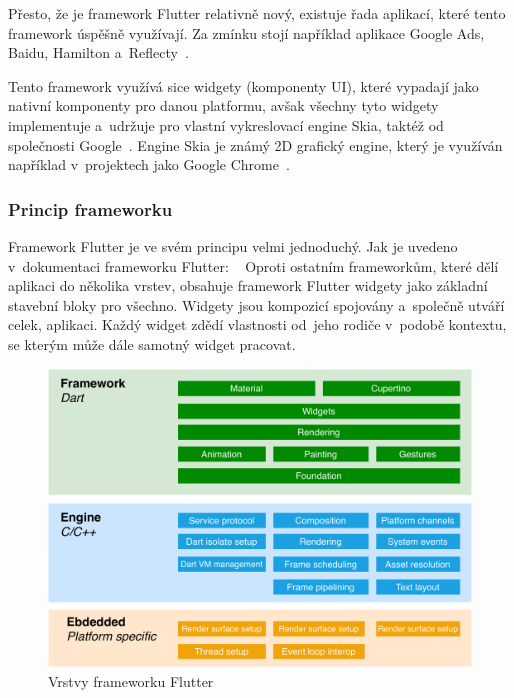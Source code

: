 Přesto,
že je framework Flutter relativně nový,
existuje řada aplikací,
které tento framework úspěšně využívají.
Za zmínku stojí například aplikace Google Ads, Baidu, Hamilton
a~Reflecty~\cite{flutter}.

Tento framework využívá sice widgety (komponenty UI),
které vypadají jako nativní komponenty pro danou platformu,
avšak všechny tyto widgety implementuje a~udržuje pro vlastní vykreslovací
engine Skia,
taktéž od společnosti Google~\cite{flutter}.
Engine Skia je známý 2D grafický engine,
který je využíván například v~projektech jako Google Chrome~\cite{skia}.

\subsubsection*{Princip frameworku}

Framework Flutter je ve svém principu velmi jednoduchý.
Jak je uvedeno v~dokumentaci frameworku Flutter:
\emph{}~\cite{flutter_technical_overview}
Oproti ostatním frameworkům,
které dělí aplikaci do několika vrstev,
obsahuje framework \mbox{Flutter} widgety jako základní stavební bloky pro všechno.
Widgety jsou kompozicí spojovány a~společně utváří celek, aplikaci.
Každý widget zdědí vlastnosti od~jeho rodiče v~podobě kontextu,
se kterým může dále samotný widget pracovat.~\cite{flutter_technical_overview}

\begin{figure}
    \centering
    \includegraphics[width=\linewidth]{assets/technology-research/framework/flutter_overview.pdf}
    \caption{Vrstvy frameworku Flutter~\cite{flutter_technical_overview}}
    \label{fig:flutter_layers}
\end{figure}

